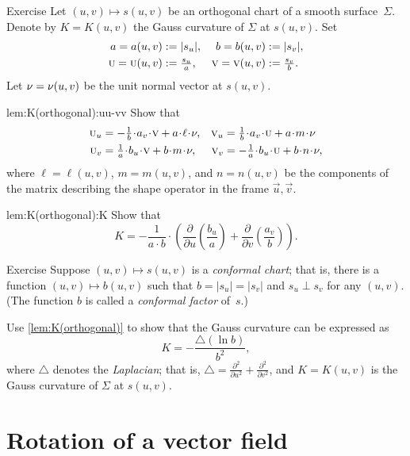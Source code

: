 \begin{thm}{Exercise}\label{lem:K(orthogonal)}
Let $(u,v)\mapsto s(u,v)$ be an orthogonal chart of a smooth surface~$\Sigma$.
Denote by $K=K(u,v)$ the Gauss curvature of $\Sigma$ at $s(u,v)$.
Set 
\begin{align*}
a=a(u,v)&\mathrel{:=}|s_u|,&
b=b(u,v)&\mathrel{:=}|s_v|,\\
\text{\sc{u}}=\text{\sc{u}}(u,v)&\mathrel{:=}\tfrac{s_u}a,&
\text{\sc{v}}=\text{\sc{v}}(u,v)&\mathrel{:=}\tfrac{s_v}b.
\end{align*}
Let $\nu=\nu(u,v)$ be the unit normal vector at $s(u,v)$.

\begin{subthm}{lem:K(orthogonal):uu-vv}
Show that 
\[
\begin{aligned}
\vec u_u
&=
-\tfrac1{b}\cdot a_v
\cdot
\vec v 
+
a\cdot \ell\cdot \Norm
,
&
\vec v_u
&=
\tfrac1{b}\cdot a_v
\cdot \vec u
+
a\cdot m\cdot \Norm
\\
\vec u_v
&=
\tfrac1{a}\cdot b_u\cdot\vec v
+
b\cdot m\cdot \Norm
,
&
\vec v_v
&=
-\tfrac1{a}\cdot b_u\cdot\vec u
+
b\cdot n\cdot \Norm,
\end{aligned}
\]
where $\ell=\ell(u,v)$, $m=m(u,v)$, and $n=n(u,v)$ be the components of the matrix describing the shape operator in the frame $\vec u, \vec v$.
\end{subthm}

\begin{subthm}{lem:K(orthogonal):K}
Show that
\[K=-\frac1{a\cdot b}\cdot
\left(
\frac{\partial}{\partial u}
\left(\frac{b_u}a \right)
+
\frac{\partial}{\partial v}
\left(\frac{a_v}b\right)
\right).\]
\end{subthm}
\end{thm}


\begin{thm}{Exercise}\label{ex:conformal}
Suppose $(u,v)\mapsto s(u,v)$ is a \emph{conformal chart};
that is, there is a function $(u,v)\mapsto b(u,v)$ such that $b=|s_u|=|s_v|$ and $s_u\perp s_v$ for any $(u,v)$.
(The function $b$ is called a \emph{conformal factor} of~$s$.)

Use \ref{lem:K(orthogonal)} to show that the Gauss curvature can be expressed as 
\[K=-\frac{\triangle (\ln b)}{b^2},\]
where $\triangle$ denotes the \emph{Laplacian}; that is, $\triangle=\tfrac{\partial^2}{\partial u^2}+\tfrac{\partial^2}{\partial v^2}$, and 
 $K=K(u,v)$ is the Gauss curvature of $\Sigma$ at $s(u,v)$.
\end{thm}

\section{Rotation of a vector field}

